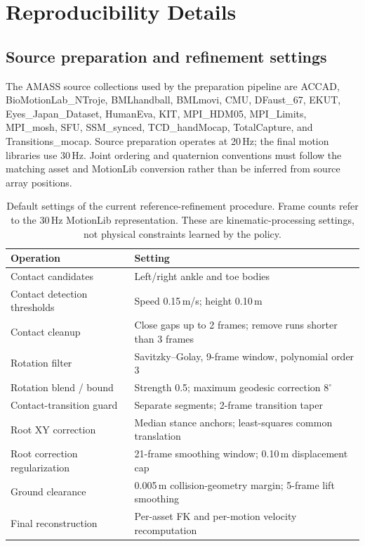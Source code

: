 \section{Reproducibility Details}\label{app:reproducibility}

\subsection{Source preparation and refinement settings}\label{app:preprocessing}

The AMASS source collections used by the preparation pipeline are ACCAD,
BioMotionLab\_NTroje, BMLhandball, BMLmovi, CMU, DFaust\_67, EKUT,
Eyes\_Japan\_Dataset, HumanEva, KIT, MPI\_HDM05, MPI\_Limits, MPI\_mosh,
SFU, SSM\_synced, TCD\_handMocap, TotalCapture, and Transitions\_mocap.
Source preparation operates at 20\,Hz; the final motion libraries use
30\,Hz. Joint ordering and quaternion conventions must follow the matching
asset and MotionLib conversion rather than be inferred from source array
positions.

\begin{table}[htbp]
\centering
\small
\caption{Default settings of the current reference-refinement procedure.
Frame counts refer to the 30\,Hz MotionLib representation. These are
kinematic-processing settings, not physical constraints learned by the policy.}\label{tab:refinement_parameters}
\begin{tabularx}{\linewidth}{@{}lY@{}}
\toprule
Operation & Setting \\
\midrule
Contact candidates & Left/right ankle and toe bodies \\
Contact detection thresholds & Speed 0.15\,m/s; height 0.10\,m \\
Contact cleanup & Close gaps up to 2 frames; remove runs shorter than 3 frames \\
Rotation filter & Savitzky--Golay, 9-frame window, polynomial order 3 \\
Rotation blend / bound & Strength 0.5; maximum geodesic correction $8^\circ$ \\
Contact-transition guard & Separate segments; 2-frame transition taper \\
Root XY correction & Median stance anchors; least-squares common translation \\
Root correction regularization & 21-frame smoothing window; 0.10\,m displacement cap \\
Ground clearance & 0.005\,m collision-geometry margin; 5-frame lift smoothing \\
Final reconstruction & Per-asset FK and per-motion velocity recomputation \\
\bottomrule
\end{tabularx}
\end{table}

